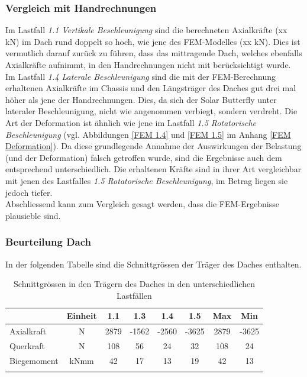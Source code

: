 \subsubsection{Vergleich mit Handrechnungen}
Im Lastfall \emph{1.1 Vertikale Beschleunigung} sind die berechneten Axialkräfte (xx kN) im Dach rund doppelt so hoch, wie jene des FEM-Modelles (xx kN). Dies ist vermutlich darauf zurück zu führen, dass das mittragende Dach, welches ebenfalls Axialkräfte aufnimmt, in den Handrechnungen nicht mit berücksichtigt wurde.\\
Im Lastfall \emph{1.4 Laterale Beschleunigung} sind die mit der FEM-Berechnung erhaltenen Axialkräfte im Chassis und den Längsträger des Daches gut drei mal höher als jene der Handrechnungen. Dies, da sich der Solar Butterfly unter lateraler Beschleunigung, nicht wie angenommen verbiegt, sondern verdreht. Die Art der Deformation ist ähnlich wie jene im Lastfall \emph{1.5 Rotatorische Beschleunigung} (vgl. Abbildungen \ref{FEM 1.4} und \ref{FEM 1.5} im Anhang \ref{FEM Deformation}). Da diese grundlegende Annahme der Auswirkungen der Belastung (und der Deformation) falsch getroffen wurde, sind die Ergebnisse auch dem entsprechend unterschiedlich. Die erhaltenen Kräfte sind in ihrer Art vergleichbar mit jenen des Lastfalles \emph{1.5 Rotatorische Beschleunigung}, im Betrag liegen sie jedoch tiefer.\\
Abschliessend kann zum Vergleich gesagt werden, dass die FEM-Ergebnisse plausieble sind.

\subsubsection{Beurteilung Dach}
In der folgenden Tabelle sind die Schnittgrössen der Träger des Daches enthalten.

\begin{table}[H]
\centering
\begin{tabular}{lccccccc}
\thickhline
&	Einheit	&	1.1	&	1.3	&	1.4	&	1.5	&	Max	&	Min	\\	\hline
Axialkraft	&	N	&	2879	&	-1562	&	-2560	&	-3625	&	2879	&	-3625	\\
Querkraft	&	N	&	108	&	56	&	24	&	32	&	108	&	24	\\
Biegemoment	&	kNmm	&	42	&	17	&	13	&	19	&	42	&	13	\\	\thickhline
\end{tabular}
\caption{Schnittgrössen in den Trägern des Daches in den unterschiedlichen Lastfällen}
\label{tab:FEMres Dach}
\end{table}

